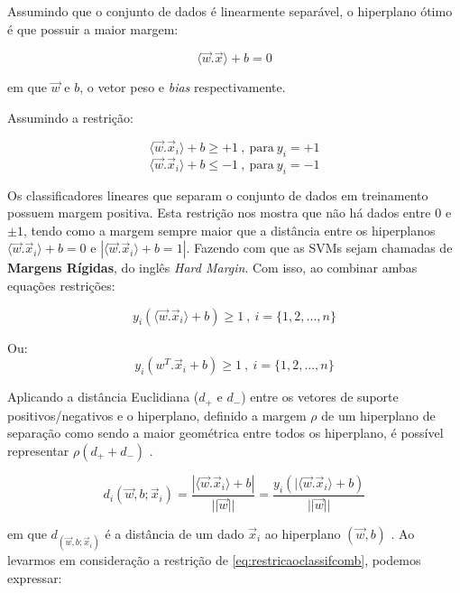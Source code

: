\documentclass[
  openany]{book}
\begin{document}
Assumindo que o conjunto de dados é linearmente separável, o hiperplano ótimo é que possuir a maior margem:

\begin{equation}
\langle\vec{w}.\vec{x}\rangle+b=0
\label{eq:maiormarg}
\end{equation}

em que \(\vec{w}\) e \(b\), o vetor peso e \emph{bias} respectivamente.

Assumindo a restrição:

\[\langle\vec{w}.\vec{x}_i\rangle+b\geq + 1 \ , \ \mbox{para} \ y_i=+1\]
\begin{equation}
\langle\vec{w}.\vec{x}_i\rangle+b\leq - 1 \ , \ \mbox{para} \ y_i=-1
\label{eq:restricaoclassif}
\end{equation}

Os classificadores lineares que separam o conjunto de dados em treinamento possuem margem positiva. Esta restrição nos mostra que não há dados entre 0 e \(\pm1\), tendo como a margem sempre maior que a distância entre os hiperplanos \(\langle\vec{w}.\vec{x}_i\rangle+b=0\) e \(|\langle\vec{w}.\vec{x}_i\rangle+b= 1|\). Fazendo com que as SVMs sejam chamadas de \textbf{Margens Rígidas}, do inglês \emph{Hard Margin}. Com isso, ao combinar ambas equações restrições:

\begin{equation}
y_i(\langle\vec{w}.\vec{x}_i\rangle+b)\geq  1 \ ,  \ i=\{1,2,...,n\}
\label{eq:restricaoclassifcom}
\end{equation}

Ou:
\begin{equation}
y_i(w^T.\vec{x}_i+b)\geq  1 \ ,  \ i=\{1,2,...,n\}
\label{eq:restricaoclassifcomb}
\end{equation}

Aplicando a distância Euclidiana (\(d_+\) e \(d_-\)) entre os vetores de suporte positivos/negativos e o hiperplano, definido a margem \(\rho\) de um hiperplano de separação como sendo a maior geométrica entre todos os hiperplano, é possível representar \(\rho(d_+ + d_-)\) \citep{gonccalves2015maquina}.

\begin{equation}
d_i(\vec{w},b;\vec{x}_i)=\frac{|\langle\vec{w}.\vec{x}_i\rangle+b|}{||\vec{w}||}=\frac{y_i(|\langle\vec{w}.\vec{x}_i\rangle+b)}{||\vec{w}||}
\label{eq:distanciahip}
\end{equation}

em que \(d_(\vec{w},b;\vec{x}_i)\) é a distância de um dado \(\vec{x}_i\) ao hiperplano \((\vec{w},b)\) \citep{lima2002maquinas}. Ao levarmos em consideração a restrição de \eqref{eq:restricaoclassifcomb}, podemos expressar:
\end{document}
